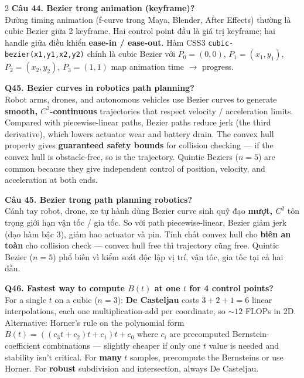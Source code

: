 \begin{paracol}{2}
\textbf{Câu 44. Bezier trong animation (keyframe)?}\\
Đường timing animation (f-curve trong Maya, Blender, After Effects) thường là cubic Bezier giữa 2 keyframe. Hai control point đầu là giá trị keyframe; hai handle giữa điều khiển \textbf{ease-in / ease-out}. Hàm CSS3 \texttt{cubic-bezier(x1,y1,x2,y2)} chính là cubic Bezier với $P_0=(0,0)$, $P_1=(x_1,y_1)$, $P_2=(x_2,y_2)$, $P_3=(1,1)$ map animation time $\to$ progress.

\switchcolumn*

\textbf{Q45. Bezier curves in robotics path planning?}\\
Robot arms, drones, and autonomous vehicles use Bezier curves to generate \textbf{smooth, $C^2$-continuous} trajectories that respect velocity / acceleration limits. Compared with piecewise-linear paths, Bezier paths reduce jerk (the third derivative), which lowers actuator wear and battery drain. The convex hull property gives \textbf{guaranteed safety bounds} for collision checking — if the convex hull is obstacle-free, so is the trajectory. Quintic Beziers ($n=5$) are common because they give independent control of position, velocity, and acceleration at both ends.

\switchcolumn

\textbf{Câu 45. Bezier trong path planning robotics?}\\
Cánh tay robot, drone, xe tự hành dùng Bezier curve sinh quỹ đạo \textbf{mượt, $C^2$} tôn trọng giới hạn vận tốc / gia tốc. So với path piecewise-linear, Bezier giảm jerk (đạo hàm bậc 3), giảm hao actuator và pin. Tính chất convex hull cho \textbf{biên an toàn} cho collision check — convex hull free thì trajectory cũng free. Quintic Bezier ($n=5$) phổ biến vì kiểm soát độc lập vị trí, vận tốc, gia tốc tại cả hai đầu.

\switchcolumn*

\textbf{Q46. Fastest way to compute $B(t)$ at one $t$ for 4 control points?}\\
For a single $t$ on a cubic ($n=3$): \textbf{De Casteljau} costs $3{+}2{+}1=6$ linear interpolations, each one multiplication-add per coordinate, so $\sim 12$ FLOPs in 2D. Alternative: Horner's rule on the polynomial form $B(t)=((c_3 t + c_2) t + c_1) t + c_0$ where $c_i$ are precomputed Bernstein-coefficient combinations — slightly cheaper if only one $t$ value is needed and stability isn't critical. For \textbf{many} $t$ samples, precompute the Bernsteins or use Horner. For \textbf{robust} subdivision and intersection, always De Casteljau.


\end{paracol}
